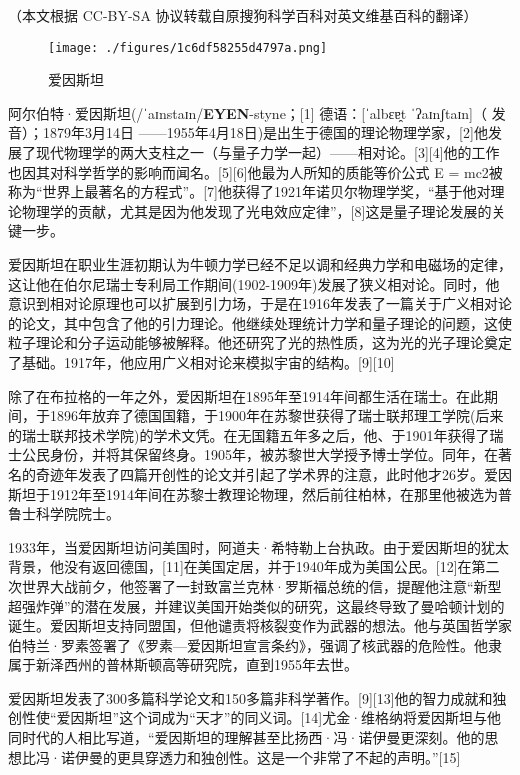 
（本文根据 CC-BY-SA 协议转载自原搜狗科学百科对英文维基百科的翻译）

\begin{figure}[ht]
\centering
\texttt{[image: ./figures/1c6df58255d4797a.png]}
\caption{爱因斯坦} \label{fig_AYST_24}
\end{figure}

阿尔伯特·爱因斯坦(/ˈaɪnstaɪn/\textbf{EYEN}-styne；[1] 德语：[ˈalbɛɐ̯t ˈʔaɪnʃtaɪn]（ 发音）；1879年3月14日 ——1955年4月18日)是出生于德国的理论物理学家，[2]他发展了现代物理学的两大支柱之一（与量子力学一起）——相对论。[3][4]他的工作也因其对科学哲学的影响而闻名。[5][6]他最为人所知的质能等价公式 E = mc2被称为“世界上最著名的方程式”。[7]他获得了1921年诺贝尔物理学奖，“基于他对理论物理学的贡献，尤其是因为他发现了光电效应定律”，[8]这是量子理论发展的关键一步。

爱因斯坦在职业生涯初期认为牛顿力学已经不足以调和经典力学和电磁场的定律，这让他在伯尔尼瑞士专利局工作期间(1902-1909年)发展了狭义相对论。同时，他意识到相对论原理也可以扩展到引力场，于是在1916年发表了一篇关于广义相对论的论文，其中包含了他的引力理论。他继续处理统计力学和量子理论的问题，这使粒子理论和分子运动能够被解释。他还研究了光的热性质，这为光的光子理论奠定了基础。1917年，他应用广义相对论来模拟宇宙的结构。[9][10]

除了在布拉格的一年之外，爱因斯坦在1895年至1914年间都生活在瑞士。在此期间，于1896年放弃了德国国籍，于1900年在苏黎世获得了瑞士联邦理工学院(后来的瑞士联邦技术学院)的学术文凭。在无国籍五年多之后，他、于1901年获得了瑞士公民身份，并将其保留终身。1905年，被苏黎世大学授予博士学位。同年，在著名的奇迹年发表了四篇开创性的论文并引起了学术界的注意，此时他才26岁。爱因斯坦于1912年至1914年间在苏黎士教理论物理，然后前往柏林，在那里他被选为普鲁士科学院院士。

1933年，当爱因斯坦访问美国时，阿道夫·希特勒上台执政。由于爱因斯坦的犹太背景，他没有返回德国，[11]在美国定居，并于1940年成为美国公民。[12]在第二次世界大战前夕，他签署了一封致富兰克林·罗斯福总统的信，提醒他注意“新型超强炸弹”的潜在发展，并建议美国开始类似的研究，这最终导致了曼哈顿计划的诞生。爱因斯坦支持同盟国，但他谴责将核裂变作为武器的想法。他与英国哲学家伯特兰·罗素签署了《罗素—爱因斯坦宣言条约》，强调了核武器的危险性。他隶属于新泽西州的普林斯顿高等研究院，直到1955年去世。

爱因斯坦发表了300多篇科学论文和150多篇非科学著作。[9][13]他的智力成就和独创性使“爱因斯坦”这个词成为“天才”的同义词。[14]尤金·维格纳将爱因斯坦与他同时代的人相比写道，“爱因斯坦的理解甚至比扬西·冯·诺伊曼更深刻。他的思想比冯·诺伊曼的更具穿透力和独创性。这是一个非常了不起的声明。”[15]

